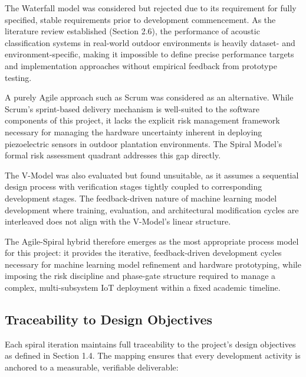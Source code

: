 \documentclass[12pt,a4paper,oneside]{memoir}
\begin{document}
The Waterfall model was considered but rejected due to its requirement for fully specified, stable requirements prior to development commencement. As the literature review established (Section 2.6), the performance of acoustic classification systems in real-world outdoor environments is heavily dataset- and environment-specific, making it impossible to define precise performance targets and implementation approaches without empirical feedback from prototype testing.

A purely Agile approach such as Scrum was considered as an alternative. While Scrum's sprint-based delivery mechanism is well-suited to the software components of this project, it lacks the explicit risk management framework necessary for managing the hardware uncertainty inherent in deploying piezoelectric sensors in outdoor plantation environments. The Spiral Model's formal risk assessment quadrant addresses this gap directly.

The V-Model was also evaluated but found unsuitable, as it assumes a sequential design process with verification stages tightly coupled to corresponding development stages. The feedback-driven nature of machine learning model development where training, evaluation, and architectural modification cycles are interleaved does not align with the V-Model's linear structure.

The Agile-Spiral hybrid therefore emerges as the most appropriate process model for this project: it provides the iterative, feedback-driven development cycles necessary for machine learning model refinement and hardware prototyping, while imposing the risk discipline and phase-gate structure required to manage a complex, multi-subsystem IoT deployment within a fixed academic timeline.

\subsection{Traceability to Design Objectives}

Each spiral iteration maintains full traceability to the project's design objectives as defined in Section 1.4. The mapping ensures that every development activity is anchored to a measurable, verifiable deliverable:
\end{document}
